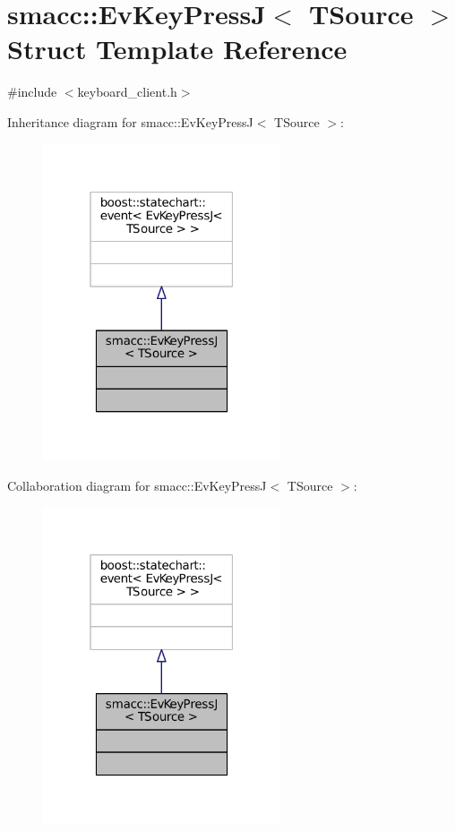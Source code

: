 \hypertarget{structsmacc_1_1EvKeyPressJ}{}\section{smacc\+:\+:Ev\+Key\+PressJ$<$ T\+Source $>$ Struct Template Reference}
\label{structsmacc_1_1EvKeyPressJ}


{\ttfamily \#include $<$keyboard\+\_\+client.\+h$>$}



Inheritance diagram for smacc\+:\+:Ev\+Key\+PressJ$<$ T\+Source $>$\+:
\nopagebreak
\begin{figure}[H]
\begin{center}
\leavevmode
\includegraphics[width=199pt]{structsmacc_1_1EvKeyPressJ__inherit__graph}
\end{center}
\end{figure}


Collaboration diagram for smacc\+:\+:Ev\+Key\+PressJ$<$ T\+Source $>$\+:
\nopagebreak
\begin{figure}[H]
\begin{center}
\leavevmode
\includegraphics[width=199pt]{structsmacc_1_1EvKeyPressJ__coll__graph}
\end{center}
\end{figure}


